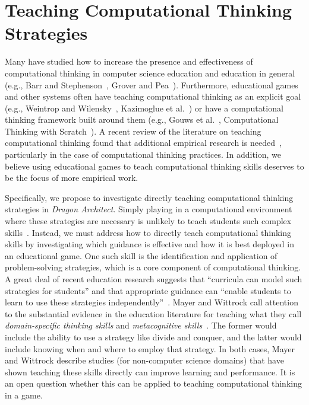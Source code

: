 \documentclass{sig-alternate}
\begin{document}
\section{Teaching Computational Thinking Strategies}

Many have studied how to increase the presence and effectiveness of computational thinking in computer science education and education in general (e.g., Barr and Stephenson~\cite{barr2011bringing}, Grover and Pea~\cite{grover2013computational}). 
Furthermore, educational games and other systems often have teaching computational thinking as an explicit goal (e.g., Weintrop and Wilensky~\cite{weintrop2013robobuilder},  Kazimoglue et al.~\cite{kazimoglu2012serious}) or have a computational thinking framework built around them (e.g., Gouws et al.~\cite{gouws2013lightbot}, Computational Thinking with Scratch~\cite{scratchedCT}).
A recent review of the literature on teaching computational thinking found that additional empirical research is needed~\cite{lye2014review}, particularly in the case of computational thinking practices.
In addition, we believe using educational games to teach computational thinking skills deserves to be the focus of more empirical work. 

Specifically, we propose to investigate directly teaching computational thinking strategies in \emph{Dragon Architect}. 
Simply playing in a computational environment where these strategies are necessary is unlikely to teach students such complex skills~\cite{mayer2004should}.
Instead, we must address how to directly teach computational thinking skills by investigating which guidance is effective and how it is best deployed in an educational game.
One such skill is the identification and application of problem-solving strategies, which is a core component of computational thinking.
A great deal of recent education research suggests that ``curricula can model such strategies for students'' and that appropriate guidance can ``enable students to learn to use these strategies independently''~\cite{report2010computational}.
Mayer and Wittrock call attention to the substantial evidence in the education literature for teaching what they call \emph{domain-specific thinking skills} and \emph{metacognitive skills}~\cite{mayer1996handbook}.
The former would include the ability to use a strategy like divide and conquer, and the latter would include knowing when and where to employ that strategy.
In both cases, Mayer and Wittrock describe studies (for non-computer science domains) that have shown teaching these skills directly can improve learning and performance. 
It is an open question whether this can be applied to teaching computational thinking in a game.
\end{document}
